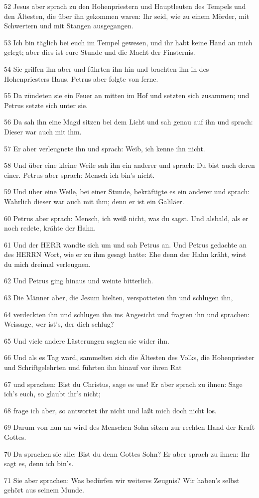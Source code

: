 \par 52 Jesus aber sprach zu den Hohenpriestern und Hauptleuten des Tempels und den Ältesten, die über ihn gekommen waren: Ihr seid, wie zu einem Mörder, mit Schwertern und mit Stangen ausgegangen.
\par 53 Ich bin täglich bei euch im Tempel gewesen, und ihr habt keine Hand an mich gelegt; aber dies ist eure Stunde und die Macht der Finsternis.
\par 54 Sie griffen ihn aber und führten ihn hin und brachten ihn in des Hohenpriesters Haus. Petrus aber folgte von ferne.
\par 55 Da zündeten sie ein Feuer an mitten im Hof und setzten sich zusammen; und Petrus setzte sich unter sie.
\par 56 Da sah ihn eine Magd sitzen bei dem Licht und sah genau auf ihn und sprach: Dieser war auch mit ihm.
\par 57 Er aber verleugnete ihn und sprach: Weib, ich kenne ihn nicht.
\par 58 Und über eine kleine Weile sah ihn ein anderer und sprach: Du bist auch deren einer. Petrus aber sprach: Mensch ich bin's nicht.
\par 59 Und über eine Weile, bei einer Stunde, bekräftigte es ein anderer und sprach: Wahrlich dieser war auch mit ihm; denn er ist ein Galiläer.
\par 60 Petrus aber sprach: Mensch, ich weiß nicht, was du sagst. Und alsbald, als er noch redete, krähte der Hahn.
\par 61 Und der HERR wandte sich um und sah Petrus an. Und Petrus gedachte an des HERRN Wort, wie er zu ihm gesagt hatte: Ehe denn der Hahn kräht, wirst du mich dreimal verleugnen.
\par 62 Und Petrus ging hinaus und weinte bitterlich.
\par 63 Die Männer aber, die Jesum hielten, verspotteten ihn und schlugen ihn,
\par 64 verdeckten ihn und schlugen ihn ins Angesicht und fragten ihn und sprachen: Weissage, wer ist's, der dich schlug?
\par 65 Und viele andere Lästerungen sagten sie wider ihn.
\par 66 Und als es Tag ward, sammelten sich die Ältesten des Volks, die Hohenpriester und Schriftgelehrten und führten ihn hinauf vor ihren Rat
\par 67 und sprachen: Bist du Christus, sage es uns! Er aber sprach zu ihnen: Sage ich's euch, so glaubt ihr's nicht;
\par 68 frage ich aber, so antwortet ihr nicht und laßt mich doch nicht los.
\par 69 Darum von nun an wird des Menschen Sohn sitzen zur rechten Hand der Kraft Gottes.
\par 70 Da sprachen sie alle: Bist du denn Gottes Sohn? Er aber sprach zu ihnen: Ihr sagt es, denn ich bin's.
\par 71 Sie aber sprachen: Was bedürfen wir weiteres Zeugnis? Wir haben's selbst gehört aus seinem Munde.

